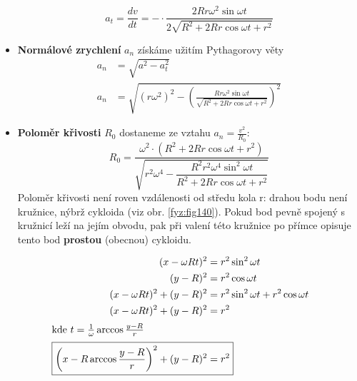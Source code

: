 \begin{mdframed}[style=mdexam]
\begin{example}
\begin{itemize}
\begin{equation*}
          a_t = \frac{dv}{dt} = -\cdot\frac{2Rr\omega^2\sin\omega t }{2\sqrt{R^2 + 
                  2Rr\cos\omega t + r^2}}
        \end{equation*}
      \item \textbf{Normálové zrychlení} \(a_n\) získáme užitím Pythagorovy věty
        \begin{align*}
          a_n &= \sqrt{a^2 - a_t^2}                                                 \\
          a_n &= \sqrt{(r\omega^2)^2-\left(
                \frac{Rr\omega^2\sin\omega t}
                      {\sqrt{R^2 + 2Rr\cos\omega t + r^2}}\right)^2}
        \end{align*}
      \item \textbf{Poloměr křivosti} $R_0$ dostaneme ze vztahu $a_n=\frac{v^2}{R_0}$:
        \begin{equation*}
            R_0 =  \dfrac{\omega^2\cdot(R^2 + 2Rr\cos\omega t + r^2)}{\sqrt{r^2\omega^4 - 
                    \dfrac{R^2r^2\omega^4\sin^2\omega t}{R^2 + 2Rr\cos\omega t + r^2}}}
        \end{equation*}
        Poloměr křivosti není roven vzdálenosti od středu kola r: drahou bodu není kružnice, nýbrž 
        cykloida (viz obr. \ref{fyz:fig140}). Pokud bod pevně spojený s kružnicí leží na 
        jejím obvodu, pak při valení této kružnice po přímce opisuje tento bod \textbf{prostou} 
        (obecnou) cykloidu. 
    \end{itemize}
    
    \begin{gather*}
      \begin{align*}
        (x - \omega R t)^2            &= r^2\sin^2\omega t                          \\
        (y-R)^2                       &= r^2\cos\omega t                            \\
        (x - \omega R t)^2 + (y-R)^2  &= r^2\sin^2\omega t + r^2\cos\omega t        \\
        (x - \omega R t)^2 + (y-R)^2  &= r^2 \quad                                  \\
        \shortintertext{kde \(t = \frac{1}{\omega}\arccos\frac{y-R}{r}\)}
        \Aboxed{\left(x - R\arccos\frac{y-R}{r}\right)^2 + (y-R)^2  &= r^2}
      \end{align*}
    \end{gather*}

    {\centering
      \captionsetup{type=figure}
      \label{fyz:fig140}
      \par}       
      \vspace{1em}
    

\end{example}
\end{mdframed}
